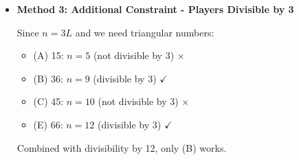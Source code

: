 \documentclass[12pt]{article}
\begin{document}
\begin{techniquesbox}
\begin{itemize}[leftmargin=*]
    Substituting:
    \begin{align*}
    2.4g_R &= \frac{3L(3L-1)}{2}\\
    g_R &= \frac{3L(3L-1)}{4.8} = \frac{5L(3L-1)}{8}
    \end{align*}
    
    For integer solution, numerator must be divisible by 8.
    
    Try small values of $L$:
    \begin{itemize}
        \item $L=1$: $n=3$, games = $\frac{3 \cdot 2}{2} = 3$ (not in choices)
        \item $L=2$: $n=6$, games = $\frac{6 \cdot 5}{2} = 15$ (choice A)
        \item $L=3$: $n=9$, games = $\frac{9 \cdot 8}{2} = 36$ (choice B)
        \item $L=4$: $n=12$, games = $\frac{12 \cdot 11}{2} = 66$ (choice E)
    \end{itemize}
    
    Check which gives integer $g_R$:
    \begin{itemize}
        \item $L=2$: $g_R = \frac{5 \cdot 2 \cdot 5}{8} = \frac{50}{8}$ not integer $\times$
        \item $L=3$: $g_R = \frac{5 \cdot 3 \cdot 8}{8} = 15$ $\checkmark$
        \item $L=4$: $g_R = \frac{5 \cdot 4 \cdot 11}{8} = \frac{220}{8}$ not integer $\times$
    \end{itemize}
    
    Answer: $L=3$, total games = 36.
    
    \item \textbf{Method 3: Additional Constraint - Players Divisible by 3}
    
    Since $n = 3L$ and we need triangular numbers:
    \begin{itemize}
        \item (A) 15: $n=5$ (not divisible by 3) $\times$
        \item (B) 36: $n=9$ (divisible by 3) $\checkmark$
        \item (C) 45: $n=10$ (not divisible by 3) $\times$
        \item (E) 66: $n=12$ (divisible by 3) $\checkmark$
    \end{itemize}
    
    Combined with divisibility by 12, only (B) works.
\end{itemize}


\end{techniquesbox}
\end{document}
